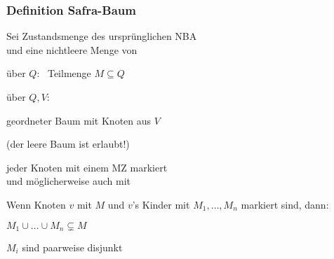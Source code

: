     \begin{frame}
      \frametitle{Definition Safra-Baum}
      
      Sei  Zustandsmenge des ursprünglichen NBA \\
      und  eine nichtleere Menge von 
      
      \parIII
       über $Q$:~ Teilmenge $M \subseteq Q$

      \parIII
       über $Q,V$:
      \begin{Itemize}
        \item
          geordneter Baum mit Knoten aus $V$
          \begin{Itemize}
            \item[]
              (der leere Baum ist erlaubt!)
          \end{Itemize}
        \item
          jeder Knoten mit einem  MZ markiert\\
          und möglicherweise auch mit \circled{!}
        \item
          Wenn Knoten $v$ mit $M$ und $v$'s Kinder mit $M_1,\dots,M_n$ markiert sind, dann:
          \begin{Enumerate}
            \item
              $M_1 \cup \dots \cup M_n \subsetneq M$
            \item
              $M_i$ sind paarweise disjunkt
          \end{Enumerate}
      \end{Itemize}

    \end{frame}

